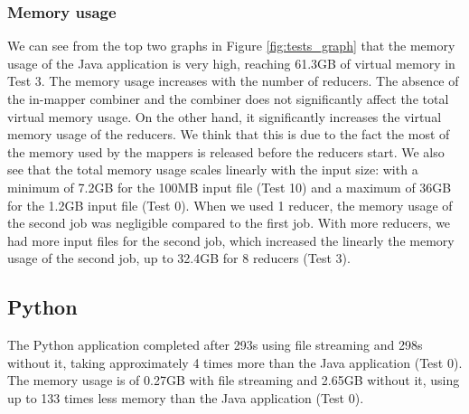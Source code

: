 \documentclass{article}
\begin{document}
\begin{multicols}{2}
        \subsubsection{Memory usage}
            We can see from the top two graphs in Figure \ref{fig:tests_graph} that the memory usage of the Java
            application is very high, reaching 61.3GB of virtual memory in Test 3.
            The memory usage increases with the number of reducers. 
            The absence of the in-mapper combiner and the combiner does not significantly affect the 
            total virtual memory usage. On the other hand, it significantly increases the virtual memory 
            usage of the reducers. 
            We think that this is due to the fact the most of the memory used by the mappers is released
            before the reducers start.
            We also see that the total memory usage scales linearly with the input size: with a minimum of
            7.2GB for the 100MB input file (Test 10) and a maximum of 36GB for the 1.2GB input file (Test 0).
            When we used 1 reducer, the memory usage of the second job was negligible compared to the first job.
            With more reducers, we had more input files for the second job, which increased the linearly
            the memory usage of the second job, up to 32.4GB for 8 reducers (Test 3).
    \subsection{Python}
        The Python application completed after 293s using file streaming and 298s without it, 
        taking approximately 4 times more than the Java application (Test 0).
        The memory usage is of 0.27GB with file streaming and 2.65GB without it, using up to 
        133 times less memory than the Java application (Test 0).

\end{multicols}
\end{document}
